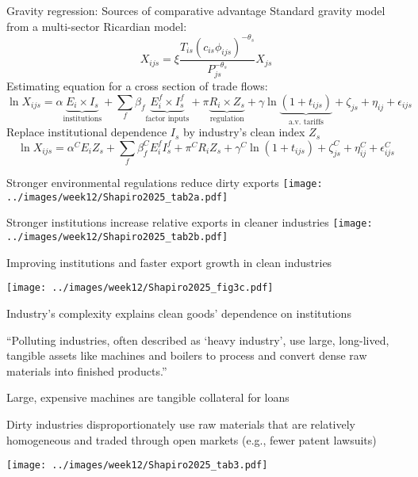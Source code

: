 \documentclass[11pt,notes=hide,aspectratio=169]{beamer}
\begin{document}
\begin{frame}{Gravity regression: Sources of comparative advantage}
Standard gravity model from a multi-sector Ricardian model:
$$
X_{ijs} = \xi \frac{T_{is}\left(c_{is}\phi_{ijs}\right)^{-\theta_s}}{P_{js}^{-\theta_s}} X_{js}
$$
Estimating equation for a cross section of trade flows:
$$
\ln X_{ijs} = \alpha \underbrace{E_i \times I_s}_{\text{institutions}} + \sum_{f} \beta_f \underbrace{E_i^f \times I_s^f}_{\text{factor inputs}} 
+ \pi \underbrace{R_i \times Z_s}_{\text{regulation}} + \gamma \ln \underbrace{(1 + t_{ijs})}_{\text{a.v. tariffs}}
+ \zeta_{js} + \eta_{ij} + \epsilon_{ijs}
$$
Replace institutional dependence $I_s$ by industry's clean index $Z_s$
$$
\ln X_{ijs} = \alpha^C {E_i Z_s} + \sum_{f} \beta_f^C {E_i^f I_s^f} 
+ \pi^C {R_i Z_s} + \gamma^C \ln {(1 + t_{ijs})}
+ \zeta_{js}^C + \eta_{ij}^C + \epsilon_{ijs}^C
$$
\end{frame}
\begin{frame}{Stronger environmental regulations reduce dirty exports}
\texttt{[image: ../images/week12/Shapiro2025\_tab2a.pdf]}
\end{frame}
\begin{frame}{Stronger institutions increase relative exports in cleaner industries}
\texttt{[image: ../images/week12/Shapiro2025\_tab2b.pdf]}
\end{frame}
\begin{frame}{Improving institutions and faster export growth in clean industries}
\begin{center}
\texttt{[image: ../images/week12/Shapiro2025\_fig3c.pdf]}
\end{center}
\end{frame}
\begin{frame}{Industry's complexity explains clean goods' dependence on institutions}
{\small ``Polluting industries, often described as `heavy industry', use large, long-lived, tangible assets like machines and boilers to process and convert dense raw materials into finished products.''\par}
\begin{itemize}{\small
\item Large, expensive machines are tangible collateral for loans
\item Dirty industries disproportionately use raw materials that are relatively homogeneous and traded through open markets (e.g., fewer patent lawsuits) \par
}\end{itemize}
\texttt{[image: ../images/week12/Shapiro2025\_tab3.pdf]}
\end{frame}
\end{document}
